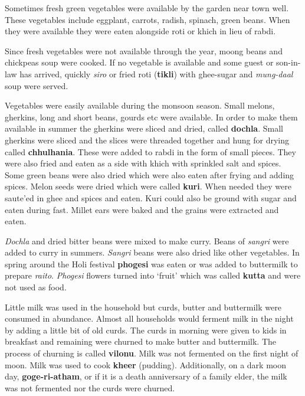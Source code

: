 Sometimes fresh green vegetables were available by the garden near town well.
These vegetables include eggplant, carrots, radish, spinach, green beans. When
they were available they were eaten alongside roti or khich in lieu of rabdi.

Since fresh vegetables were not available through the year, moong beans and
chickpeas soup were cooked. If no vegetable is available and some guest or
son-in-law has arrived, quickly \textit{siro} or fried roti (\textbf{tikli})
with ghee-sugar and \textit{mung-daal} soup were served. 

Vegetables were easily available during the monsoon season. Small melons,
gherkins, long and short beans, gourds etc were available. In order
to make them available in summer the gherkins were sliced and dried,
called \textbf{dochla}. Small gherkins were sliced and the slices
were threaded together and hung for drying called
\textbf{chhulhania}. These were added to rabdi in the form of small
pieces. They were also fried and eaten as a side with khich with
sprinkled salt and spices. Some green beans were also dried which
were also eaten after frying and adding spices. Melon seeds were
dried which were called \textbf{kuri}. When needed they were
saut{e}'ed in ghee and spices and eaten. Kuri could also be ground
with sugar and eaten during fast. Millet ears were baked and the
grains were extracted and eaten.

\textit{Dochla} and dried bitter beans were mixed to make curry. Beans of
\textit{sangri} were added to curry in summers. \textit{Sangri} beans were also
dried like other vegetables. In spring around the Holi festival
\textbf{phogesi} was eaten or was added to buttermilk to prepare
\textit{raito}. \textit{Phogesi} flowers turned into `fruit' which was called
\textbf{kutta} and were not used as food.

Little milk was used in the household but curds, butter and buttermilk were
consumed in abundance. Almost all households would ferment milk in the night by
adding a little bit of old curds. The curds in morning were given to kids in
breakfast and remaining were churned to make butter and buttermilk. The process
of churning is called \textbf{vilonu}. Milk was not fermented on the first
night of moon. Milk was used to cook \textbf{kheer} (pudding). Additionally, on
a dark moon day, \textbf{goge-ri-atham}, or if it is a death anniversary of a
family elder, the milk was not fermented nor the curds were churned. 


